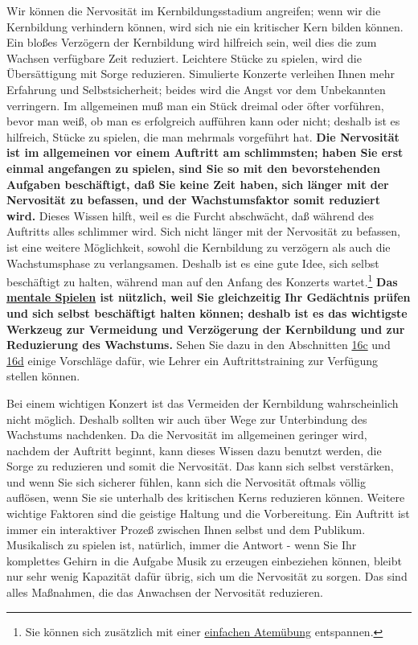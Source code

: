 Wir können die Nervosität im Kernbildungsstadium angreifen; wenn wir die Kernbildung verhindern können, wird sich nie ein kritischer Kern bilden können.
Ein bloßes Verzögern der Kernbildung wird hilfreich sein, weil dies die zum Wachsen verfügbare Zeit reduziert.
Leichtere Stücke zu spielen, wird die Übersättigung mit Sorge reduzieren.
Simulierte Konzerte verleihen Ihnen mehr Erfahrung und Selbstsicherheit; beides wird die Angst vor dem Unbekannten verringern.
Im allgemeinen muß man ein Stück dreimal oder öfter vorführen, bevor man weiß, ob man es erfolgreich aufführen kann oder nicht; deshalb ist es hilfreich, Stücke zu spielen, die man mehrmals vorgeführt hat.
\textbf{Die Nervosität ist im allgemeinen vor einem Auftritt am schlimmsten; haben Sie erst einmal angefangen zu spielen, sind Sie so mit den bevorstehenden Aufgaben beschäftigt, daß Sie keine Zeit haben, sich länger mit der Nervosität zu befassen, und der Wachstumsfaktor somit reduziert wird.}
Dieses Wissen hilft, weil es die Furcht abschwächt, daß während des Auftritts alles schlimmer wird.
Sich nicht länger mit der Nervosität zu befassen, ist eine weitere Möglichkeit, sowohl die Kernbildung zu verzögern als auch die Wachstumsphase zu verlangsamen.
Deshalb ist es eine gute Idee, sich selbst beschäftigt zu halten, während man auf den Anfang des Konzerts wartet.\footnote{Sie können sich zusätzlich mit einer \hyperref[c1ii21uebung]{einfachen Atemübung} entspannen.}
\textbf{Das \hyperref[c1ii12mental]{mentale Spielen} ist nützlich, weil Sie gleichzeitig Ihr Gedächtnis prüfen und sich selbst beschäftigt halten können; deshalb ist es das wichtigste Werkzeug zur Vermeidung und Verzögerung der Kernbildung und zur Reduzierung des Wachstums.}
Sehen Sie dazu in den Abschnitten \hyperref[c1iii16c]{16c} und \hyperref[c1iii16d]{16d} einige Vorschläge dafür, wie Lehrer ein Auftrittstraining zur Verfügung stellen können.

Bei einem wichtigen Konzert ist das Vermeiden der Kernbildung wahrscheinlich nicht möglich.
Deshalb sollten wir auch über Wege zur Unterbindung des Wachstums nachdenken.
Da die Nervosität im allgemeinen geringer wird, nachdem der Auftritt beginnt, kann dieses Wissen dazu benutzt werden, die Sorge zu reduzieren und somit die Nervosität.
Das kann sich selbst verstärken, und wenn Sie sich sicherer fühlen, kann sich die Nervosität oftmals völlig auflösen, wenn Sie sie unterhalb des kritischen Kerns reduzieren können.
Weitere wichtige Faktoren sind die geistige Haltung und die Vorbereitung.
Ein Auftritt ist immer ein interaktiver Prozeß zwischen Ihnen selbst und dem Publikum.
Musikalisch zu spielen ist, natürlich, immer die Antwort - wenn Sie Ihr komplettes Gehirn in die Aufgabe Musik zu erzeugen einbeziehen können, bleibt nur sehr wenig Kapazität dafür übrig, sich um die Nervosität zu sorgen.
Das sind alles Maßnahmen, die das Anwachsen der Nervosität reduzieren.

